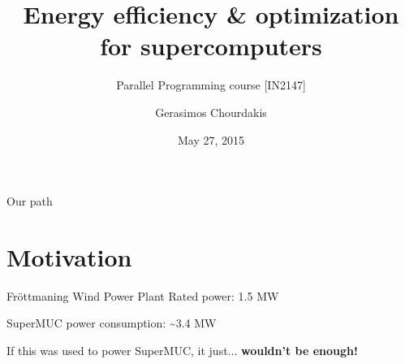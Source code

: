\documentclass[10pt, compress]{beamer}
\title{Energy efficiency \& optimization for supercomputers}
\subtitle{Parallel Programming course [IN2147]}
\date{May 27, 2015}
\author{Gerasimos Chourdakis}
\institute{Technische Universität München - Supervisor: Prof. Dr. Michael Gerndt}
\begin{document}
\maketitle

\begin{frame}[fragile]{Our path}
    \tableofcontents
\end{frame}

\section{Motivation}



\begin{frame}[fragile]{Fröttmaning Wind Power Plant}
    Rated power: 1.5 MW
    
    SuperMUC power consumption: \textasciitilde  3.4 MW
    
    \pause
    
    If this was used to power SuperMUC, it just... \textbf{wouldn't be enough!}
\end{frame}
\end{document}
